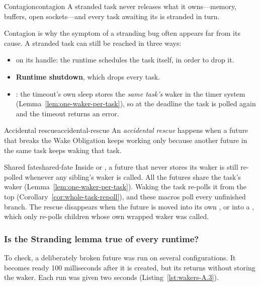 \begin{corollary}{Contagion}{contagion}
    A stranded task never releases what it owns---memory, buffers, open sockets---and every task awaiting its  is stranded in turn.
\end{corollary}

Contagion is why the symptom of a stranding bug often appears far from its cause. A stranded task can still be reached in three ways:

\begin{itemize}
    \item \textbf{} on its handle: the runtime schedules the task itself, in order to drop it.
    \item \textbf{Runtime shutdown}, which drops every task.
    \item \textbf{}: the timeout's own sleep stores the \emph{same task's} waker in the timer system (Lemma~\ref{lem:one-waker-per-task}), so at the deadline the task is polled again and the timeout returns an error.
\end{itemize}

\begin{definition}{Accidental rescue}{accidental-rescue}
    An \emph{accidental rescue} happens when a future that breaks the Wake Obligation keeps working only because another future in the same task keeps waking that task.
\end{definition}

\begin{lemma}{Shared fate}{shared-fate}
    Inside  or , a future that never stores its waker is still re-polled whenever any sibling's waker is called.
    \why All the futures share the task's waker (Lemma~\ref{lem:one-waker-per-task}). Waking the task re-polls it from the top (Corollary~\ref{cor:whole-task-repoll}), and these macros poll every unfinished branch. The rescue disappears when the future is moved into its own , or into a , which only re-polls children whose own wrapped waker was called.
\end{lemma}

\subsubsection{Is the Stranding lemma true of every runtime?}

To check, a deliberately broken future was run on several configurations. It becomes ready 100 milliseconds after it is created, but its  returns  without storing the waker. Each run was given two seconds (Listing~\ref{lst:wakers-A.3}).

